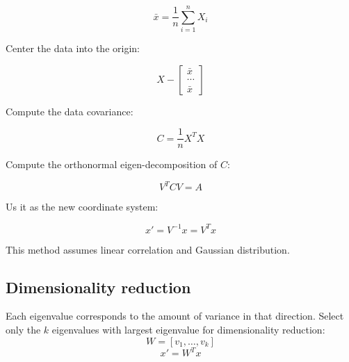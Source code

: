	$$\bar{x} = \frac{1}{n}\sum\limits_{i=1}^nX_i$$

	Center the data into the origin:

	$$X - \begin{bmatrix}\bar{x}\\\cdots\\\bar{x}\end{bmatrix}$$

	Compute the data covariance:

	$$C = \frac{1}{n}X^TX$$

	Compute the orthonormal eigen-decomposition of $C$:

	$$V^TCV=A$$

	Us it as the new coordinate system:

	$$x' = V^{-1}x = V^Tx$$

	This method assumes linear correlation and Gaussian distribution.

	\subsection{Dimensionality reduction}
	Each eigenvalue corresponds to the amount of variance in that direction.
	Select only the $k$ eigenvalues with largest eigenvalue for dimensionality reduction:
	$$W = [v_1, \dots, v_k]$$
	$$x' = W^Tx$$
